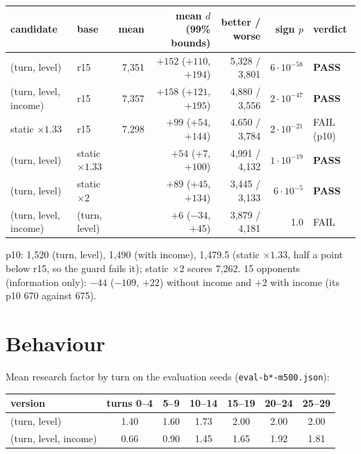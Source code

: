 \documentclass{../polyexp}
\begin{document}
\begin{center}\small
\begin{tabular}{llrrrrl}
\toprule
candidate & base & mean & mean $d$ (99\% bounds) & better / worse & sign $p$ & verdict \\
\midrule
(turn, level)         & r15 & 7{,}351 & $+152$ ($+110$, $+194$) & 5{,}328 / 3{,}801 & $6\cdot10^{-58}$ & \textbf{PASS} \\
(turn, level, income) & r15 & 7{,}357 & $+158$ ($+121$, $+195$) & 4{,}880 / 3{,}556 & $2\cdot10^{-47}$ & \textbf{PASS} \\
static $\times1.33$   & r15 & 7{,}298 & $+99$ ($+54$, $+144$)   & 4{,}650 / 3{,}784 & $2\cdot10^{-21}$ & FAIL (p10) \\
(turn, level)         & static $\times1.33$ & & $+54$ ($+7$, $+100$)   & 4{,}991 / 4{,}132 & $1\cdot10^{-19}$ & \textbf{PASS} \\
(turn, level)         & static $\times2$    & & $+89$ ($+45$, $+134$)  & 3{,}445 / 3{,}133 & $6\cdot10^{-5}$  & \textbf{PASS} \\
(turn, level, income) & (turn, level)       & & $+6$ ($-34$, $+45$)    & 3{,}879 / 4{,}181 & 1.0              & FAIL \\
\bottomrule
\end{tabular}
\end{center}

p10: 1{,}520 (turn, level), 1{,}490 (with income), 1{,}479.5 (static $\times1.33$, half a point below r15, so the
guard fails it); static $\times2$ scores 7{,}262. 15 opponents (information only): $-44$ ($-109$, $+22$) without
income and $+2$ with income (its p10 670 against 675).

\section{Behaviour}
Mean research factor by turn on the evaluation seeds (\texttt{eval-b*-m500.json}):

\begin{center}\small
\begin{tabular}{lcccccc}
\toprule
version & turns 0--4 & 5--9 & 10--14 & 15--19 & 20--24 & 25--29 \\
\midrule
(turn, level)         & 1.40 & 1.60 & 1.73 & 2.00 & 2.00 & 2.00 \\
(turn, level, income) & 0.66 & 0.90 & 1.45 & 1.65 & 1.92 & 1.81 \\
\bottomrule
\end{tabular}
\end{center}
\end{document}
